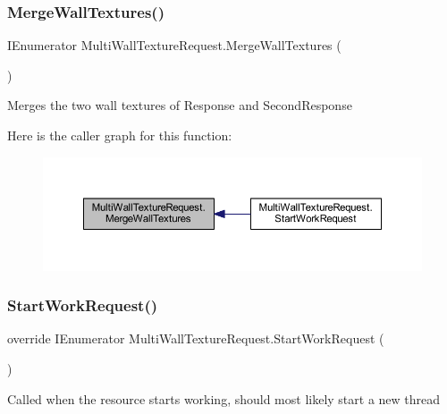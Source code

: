 \subsubsection{\texorpdfstring{Merge\+Wall\+Textures()}{MergeWallTextures()}}
{\footnotesize\ttfamily I\+Enumerator Multi\+Wall\+Texture\+Request.\+Merge\+Wall\+Textures (\begin{DoxyParamCaption}{ }\end{DoxyParamCaption})\hspace{0.3cm}{\ttfamily [private]}}



Merges the two wall textures of Response and Second\+Response 

Here is the caller graph for this function\+:
\nopagebreak
\begin{figure}[H]
\begin{center}
\leavevmode
\includegraphics[width=350pt]{class_multi_wall_texture_request_a66ff9bddcb7230947278ff32f2957ec7_icgraph}
\end{center}
\end{figure}
\mbox{\label{class_multi_wall_texture_request_a9990230b6a9cb6be581b7948f379065b}} 
\subsubsection{\texorpdfstring{Start\+Work\+Request()}{StartWorkRequest()}}
{\footnotesize\ttfamily override I\+Enumerator Multi\+Wall\+Texture\+Request.\+Start\+Work\+Request (\begin{DoxyParamCaption}{ }\end{DoxyParamCaption})\hspace{0.3cm}{\ttfamily [virtual]}}



Called when the resource starts working, should most likely start a new thread 



